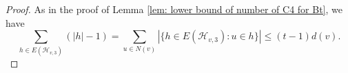\documentclass[11pt,a4paper]{article}
\theoremstyle{definition}
\newtheorem{claimthm}{Claim}[section]
\begin{document}
\begin{proof}
            As in the proof of Lemma \ref{lem: lower bound of number of C4 for Bt}, we have 
            \begin{equation}\label{eq: lem2.2 1}
                \sum_{h \in E(\mathcal{H}_{v, 3})} (|h| - 1) = \sum_{u \in N(v)} |\{h \in E(\mathcal{H}_{v, 3}): u \in h\}| \leq (t-1) d(v).
            \end{equation}



\end{proof}
\end{document}
